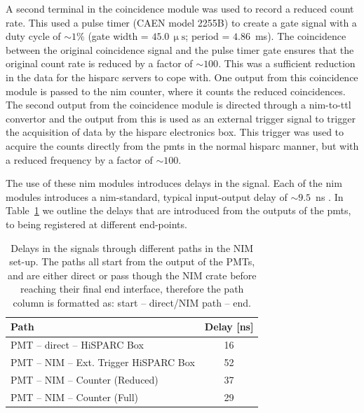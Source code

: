 A second terminal in the coincidence module was used to record a reduced count rate. This used a pulse timer (CAEN model 2255B) to create a gate signal with a duty cycle of $\sim 1\%$ (gate width = $45.0 \, \upmu\mathrm{s}$; period = $4.86$~ms). The coincidence between the original coincidence signal and the pulse timer gate ensures that the original count rate is reduced by a factor of $\sim 100$. This was a sufficient reduction in the data for the \gls{hisparc} servers to cope with. One output from this coincidence module is passed to the \gls{nim} counter, where it counts the reduced coincidences. The second output from the coincidence module is directed through a \gls{nim}-to-\gls{ttl} convertor and the output from this is used as an external trigger signal to trigger the acquisition of data by the \gls{hisparc} electronics box. This trigger was used to acquire the counts directly from the \glspl{pmt} in the normal \gls{hisparc} manner, but with a reduced frequency by a factor of $\sim100$.

The use of these \gls{nim} modules introduces delays in the signal. Each of the \gls{nim} modules introduces a \gls{nim}-standard, typical input-output delay of $\sim 9.5$~ns \citep{lecroy_lecroy_1996, caen_technical_2011}. In Table~\ref{tab:HS_14008_delays} we outline the delays that are introduced from the outputs of the \glspl{pmt}, to being registered at different end-points.

\vspace{1em}

\begin{table}[ht!]
	\begin{center}
		\caption{Delays in the signals through different paths in the NIM set-up. The paths all start from the output of the PMTs, and are either direct or pass though the NIM crate before reaching their final end interface, therefore the path column is formatted as: start -- direct/NIM path -- end.}
		\label{tab:HS_14008_delays}
		\begin{tabular}{l c }
			\hline 
			{\bf Path} & {\bf Delay [ns]} \\ 
			\hline 
			PMT -- direct -- HiSPARC Box &  16 \\ 
			PMT -- NIM -- Ext. Trigger HiSPARC Box & 52 \\ 
			PMT -- NIM -- Counter (Reduced) & 37 \\ 
			PMT -- NIM -- Counter (Full) & 29 \\ 
			\hline 
		\end{tabular} 
	\end{center}
\end{table}


